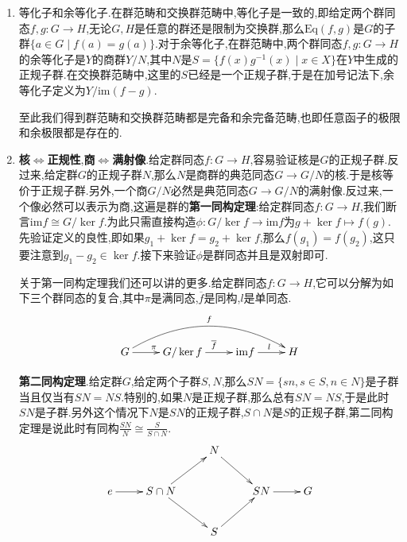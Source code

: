 \begin{enumerate}
\begin{proof}
		现在假设$L$的指数大于等于3.于是可以找到$G$中两个元$u,v$,满足$L,uL,vL$是两两不交的三个左陪集.现在构造$G$上的一个双射$\sigma$为,在$uL$上把$ul\mapsto vl$,在$vL$上把$vl\mapsto ul$,在$G\backslash (uL\cup vL)$上为恒等.记$G$上的对称群为$S(G)$,考虑$G$在自身上的右平移作用,即群同态$\alpha:G\to S(G)$为$g\mapsto\alpha_g$,其中$\alpha_g:G\to G$为$x\mapsto xg$.再构造$\beta:G\to S(G)$为群同态$g\mapsto\sigma^{-1}\circ\alpha_g\sigma$.那么有$(\beta\circ f)(x)(g)=\sigma^{-1}(\sigma(g)f(x))$.于是分$g\in uL,vL,G\backslash(uL\cup vL)$得到$(\beta\circ f)(x)(g)=gf(x)$.即$\beta\circ f=\alpha\circ f$.于是按照$f$是epic得到$\alpha=\beta$.但是只要取$x\in G\backslash(L\cup v^{-1}uL)$得到$\beta(x)(u)=vx$,$\alpha(x)(u)=ux$,$vx\not=ux$,矛盾.综上$L$的指数只能为1,也即$f$是满射.
	\end{proof}
	\item
	等化子和余等化子.在群范畴和交换群范畴中,等化子是一致的,即给定两个群同态$f,g:G\to H$,无论$G,H$是任意的群还是限制为交换群,那么$\mathrm{Eq}(f,g)$是$G$的子群$\{a\in G\mid f(a)=g(a)\}$.对于余等化子,在群范畴中,两个群同态$f,g:G\to H$的余等化子是$Y$的商群$Y/N$,其中$N$是$S=\{f(x)g^{-1}(x)\mid x\in X\}$在$Y$中生成的正规子群.在交换群范畴中,这里的$S$已经是一个正规子群,于是在加号记法下,余等化子定义为$Y/\mathrm{im}(f-g)$.
	
	至此我们得到群范畴和交换群范畴都是完备和余完备范畴,也即任意函子的极限和余极限都是存在的.
	
	\item \textbf{核$\Leftrightarrow$正规性},\textbf{商$\Leftrightarrow$满射像}.给定群同态$f:G\to H$,容易验证核是$G$的正规子群.反过来,给定群$G$的正规子群$N$,那么$N$是商群的典范同态$G\to G/N$的核.于是核等价于正规子群.另外,一个商$G/N$必然是典范同态$G\to G/N$的满射像.反过来,一个像必然可以表示为商,这遍是群的\textbf{第一同构定理}:给定群同态$f:G\to H$,我们断言$\mathrm{im}f\cong G/\ker f$.为此只需直接构造$\phi:G/\ker f\to\mathrm{im}f$为$g+\ker f\mapsto f(g)$.先验证定义的良性,即如果$g_1+\ker f=g_2+\ker f$,那么$f(g_1)=f(g_2)$,这只要注意到$g_1-g_2\in\ker f$.接下来验证$\phi$是群同态并且是双射即可.
	
	关于第一同构定理我们还可以讲的更多.给定群同态$f:G\to H$,它可以分解为如下三个群同态的复合,其中$\pi$是满同态,$\overline{f}$是同构,$l$是单同态.$$\xymatrix{
		G\ar@/^2pc/[rrr]^f \ar[r]^{\pi} & G/\ker f \ar[r]^{\overline{f}} &\mathrm{im}f \ar[r]^{l} & H}$$
	
	\textbf{第二同构定理}.给定群$G$,给定两个子群$S,N$,那么$SN=\{sn,s\in S,n\in N\}$是子群当且仅当有$SN=NS$.特别的,如果$N$是正规子群,那么总有$SN=NS$,于是此时$SN$是子群.另外这个情况下$N$是$SN$的正规子群,$S\cap N$是$S$的正规子群,第二同构定理是说此时有同构$\frac{SN}{N}\cong\frac{S}{S\cap N}$.
	$$\xymatrix{&&N\ar[dr]&&\\ {e}\ar[r]&S\cap N\ar[ur]\ar[dr]&&SN\ar[r]&G \\ &&S\ar[ur]&&}$$
	

\end{enumerate}
